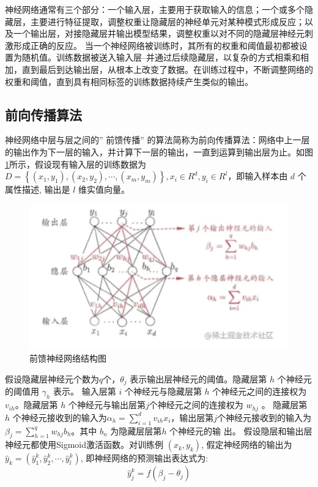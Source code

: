 神经网络通常有三个部分：一个输入层，主要用于获取输入的信息；一个或多个隐藏层，主要进行特征提取，调整权重让隐藏层的神经单元对某种模式形成反应；以及一个输出层，对接隐藏层并输出模型结果，调整权重以对不同的隐藏层神经元刺激形成正确的反应。
当一个神经网络被训练时，其所有的权重和阈值最初都被设置为随机值。训练数据被送入输入层--并通过后续隐藏层，以复杂的方式相乘和相加，直到最后到达输出层，从根本上改变了数据。在训练过程中，不断调整网络的权重和阈值，直到具有相同标签的训练数据持续产生类似的输出。

\subsection{前向传播算法}

神经网络中层与层之间的” 前馈传播” 的算法简称为前向传播算法：网络中上一层的输出作为下一层的输入，并计算下一层的输出，一直到运算到输出层为止。如图\ref{fig:前馈神经网络结构图}所示，假设现有输入层的训练数据为$D=\left\{\left(x_{1}, y_{1}\right),\left(x_{2}, y_{2}\right), \cdots,\left(x_{m}, y_{m}\right)\right\}, x_{i} \in R^{d}, y_{i} \in R^{l}$，即输入样本由 $d$ 个属性描述, 输出是 $l$ 维实值向量。

\begin{figure}[!hbt]
\centering
	\includegraphics[scale=0.7]{fig2/C2/前馈神经网络}%
	\caption{前馈神经网络结构图}
	\label{fig:前馈神经网络结构图}	
\end{figure}

假设隐藏层神经元个数为$q$个，$\theta_{j}$ 表示输出层神经元的阈值。隐藏层第 $h$ 个神经元的阈值用 $\gamma_{h}$ 表示。
输入层第 $i$ 个神经元与隐藏层第 $h$ 个神经元之间的连接权为 $v_{i h}$。隐藏层第 $h$ 个神经元与输出层第$j$个神经元之间的连接权为 $w_{h j}$ 。
隐藏层第 $h$ 个神经元接收到的输入为$\alpha_{h}=\sum_{i=1}^{d} v_{i h} x_{i}$，输出层第$j$个神经元接收到的输入为$\beta_{j}=\sum_{h=1}^{q} w_{h j} b_{h}$。其中 $b_{n}$ 为隐藏层层第$h$ 个神经元的输 出。
假设隐层和输出层神经元都使用Sigmoid激活函数。对训练例 $\left(x_{k}, y_{k}\right)$, 假定神经网络的输出为 $\hat{y}_{k}=\left(\hat{y}_{1}^{k}, \hat{y}_{2}^{k}, \cdots, \hat{y}_{l}^{k}\right)$, 即神经网络的预测输出表达式为:
\begin{equation}\label{神经网络预测输出}
\hat{y}_{j}^{k}=f\left(\beta_{j}-\theta_{j}\right)
\end{equation}

